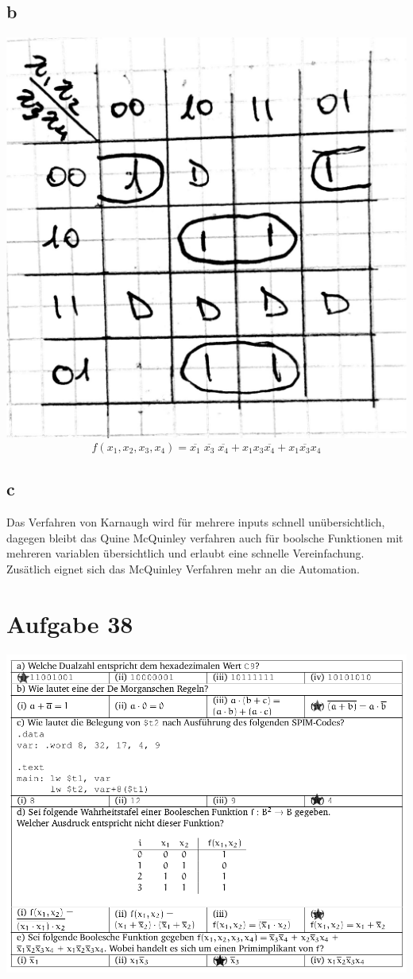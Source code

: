 \documentclass[10pt,a4paper]{article}
\begin{document}
\subsection{b}
\includegraphics[scale=0.13]{ra38b_1.jpg}\\
$$
	f(x_1,x_2,x_3,x_4)=\overline{x_1}\;\overline{x_3}\;\overline{x_4}+x_1x_3\overline{x_4}+x_1\overline{x_3}x_4
$$
\subsection{c}
Das Verfahren von Karnaugh wird für mehrere inputs schnell unübersichtlich, dagegen bleibt das Quine McQuinley verfahren auch für boolsche Funktionen mit mehreren variablen übersichtlich und erlaubt eine schnelle Vereinfachung.
Zusätlich eignet sich das McQuinley Verfahren mehr an die Automation.

\section{Aufgabe 38}
\includegraphics[scale=0.4]{RA39.png}
\end{document}

